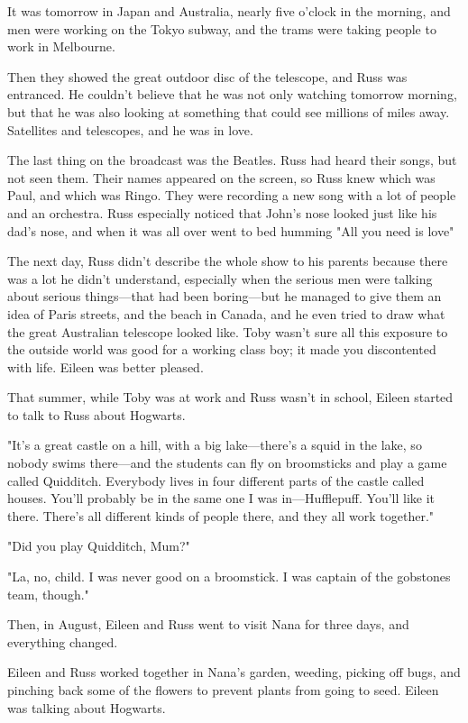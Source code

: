 It was tomorrow in Japan and Australia, nearly five o'clock in the morning, and men were working on the Tokyo subway, and the trams were taking people to work in Melbourne.

Then they showed the great outdoor disc of the telescope, and Russ was entranced. He couldn't believe that he was not only watching tomorrow morning, but that he was also looking at something that could see millions of miles away. Satellites and telescopes, and he was in love.

The last thing on the broadcast was the Beatles. Russ had heard their songs, but not seen them. Their names appeared on the screen, so Russ knew which was Paul, and which was Ringo. They were recording a new song with a lot of people and an orchestra. Russ especially noticed that John's nose looked just like his dad's nose, and when it was all over went to bed humming "All you need is love{\el}"

The next day, Russ didn't describe the whole show to his parents because there was a lot he didn't understand, especially when the serious men were talking about serious things—that had been boring—but he managed to give them an idea of Paris streets, and the beach in Canada, and he even tried to draw what the great Australian telescope looked like. Toby wasn't sure all this exposure to the outside world was good for a working class boy; it made you discontented with life. Eileen was better pleased.

That summer, while Toby was at work and Russ wasn't in school, Eileen started to talk to Russ about Hogwarts.

"It's a great castle on a hill, with a big lake—there's a squid in the lake, so nobody swims there—and the students can fly on broomsticks and play a game called Quidditch. Everybody lives in four different parts of the castle called houses. You'll probably be in the same one I was in—Hufflepuff. You'll like it there. There's all different kinds of people there, and they all work together."

"Did you play Quidditch, Mum?"

"La, no, child. I was never good on a broomstick. I was captain of the gobstones team, though."

Then, in August, Eileen and Russ went to visit Nana for three days, and everything changed.

Eileen and Russ worked together in Nana's garden, weeding, picking off bugs, and pinching back some of the flowers to prevent plants from going to seed. Eileen was talking about Hogwarts.

